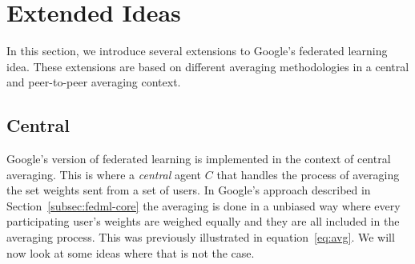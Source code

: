 \documentclass[12pt]{article}
\begin{document}
\section{Extended Ideas}\label{sec:ext-ideas}
In this section, we introduce several extensions to Google's federated learning idea. These extensions are based on different averaging methodologies in a central and peer-to-peer averaging context.
\subsection{Central}
Google's version of federated learning is implemented in the context of central averaging. This is where a \textit{central} agent $C$ that handles the process of averaging the set weights sent from a set of users. In Google's approach described in Section~\ref{subsec:fedml-core} the averaging is done in a unbiased way where every participating user's weights are weighed equally and they are all included in the averaging process. This was previously illustrated in equation~\ref{eq:avg}. We will now look at some ideas where that is not the case. 
\end{document}
